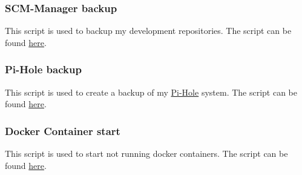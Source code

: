 \subsubsection{SCM-Manager backup}

This script is used to backup my development repositories. The script
can be found \href{https://github.com/ThirtySomething/SCM-Backup}{here}.


\subsubsection{Pi-Hole backup}

This script is used to create a backup of my \href{https://pi-hole.net/}{Pi-Hole}
system. The script can be found \href{https://github.com/ThirtySomething/NAS}{here}.


\subsubsection{Docker Container start}

This script is used to start not running docker containers. The script
can be found \href{https://github.com/ThirtySomething/NAS}{here}.

